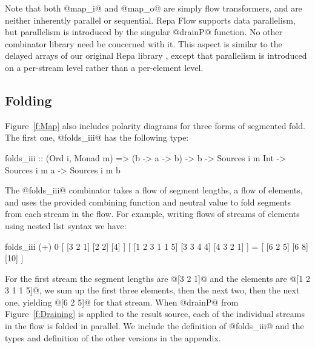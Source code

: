 
Note that both @map_i@ and @map_o@ are simply flow transformers, and are neither inherently parallel or sequential. Repa Flow supports data parallelism, but parallelism is introduced by the singular @drainP@ function. No other combinator library need be concerned with it. This aspect is similar to the delayed arrays of our original Repa library \cite{Lippmeier:Guiding}, except that parallelism is introduced on a per-stream level rather than a per-element level.


\subsection{Folding}
Figure~\ref{f:Map} also includes polarity diagrams for three forms of segmented fold. The first one, @folds_iii@ has the following type:
\begin{code}
folds_iii :: (Ord i, Monad m) => (b -> a -> b) -> b
          -> Sources i m Int  -> Sources i m a 
          -> Sources i m b
\end{code}

The @folds_iii@ combinator takes a flow of segment lengths, a flow of elements, and uses the provided combining function and neutral value to fold segments from each stream in the flow. For example, writing flows of streams of elements using nested list syntax we have:
\begin{code}
folds_iii (+) 0 
   [ [3 2 1] [2 2] [4] ] 
   [ [1 2 3 1 1 5] [3 3 4 4] [4 3 2 1] ]
 = [ [6 2 5] [6 8] [10] ]
\end{code}

For the first stream the segment lengths are @[3 2 1]@ and the elements are @[1 2 3 1 1 5]@, we sum up the first three elements, then the next two, then the next one, yielding @[6 2 5]@ for that stream. When @drainP@ from Figure~\ref{f:Draining} is applied to the result source, each of the individual streams in the flow is folded in parallel. We include the definition of @folds_iii@ and the types and definition of the other versions in the appendix.

